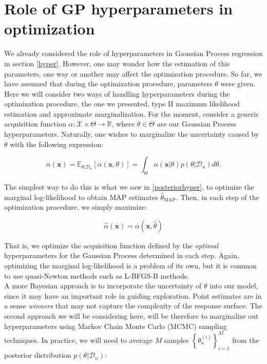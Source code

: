 \documentclass[10pt,a4paper,twoside]{book}
\begin{document}
\section{Role of GP hyperparameters in optimization}

We already considered the role of hyperparameters in Gaussian Process regression in section \ref{hyper}. However, one may wonder how the estimation of this parameters, one way or another may affect the optimization procedure. So far, we have assumed that during the optimization procedure, parameters $\theta$ were given. Here we will consider two ways of handling hyperparameters during the optimization procedure, the one we presented, type II maximum likelihood estimation and approximate marginalization. For the moment, consider a generic acquisition function $\alpha:\mathcal{X} \times \Theta \rightarrow \mathbb{R}$, where $\theta \in \Theta$ are our Gaussian Process hyperparameters. Naturally, one wishes to marginalize the uncertainty caused by $\theta$ with the following expression:

\begin{equation}
\alpha(\boldsymbol{x}) = \mathbb{E}_{\theta|\mathcal{D}_n}\left[ \alpha(\boldsymbol{x}, \theta) \right] = \int_{\Theta} \alpha(\boldsymbol{x}|\theta)p(\theta|\mathcal{D}_n)d\theta.
\end{equation}

The simplest way to do this is what we saw in \ref{posteriorhyper}, to optimize the marginal log-likelihood to obtain MAP estimates $\hat{\theta}_{\mathrm{MAP}}$. Then, in each step of the optimization procedure, we simply maximize:

\begin{equation}
\hat{\alpha}(\boldsymbol{x}) = \alpha(\boldsymbol{x}, \hat{\theta})
\end{equation}

That is, we optimize the acquisition function defined by the \textit{optimal} hyperparameters for the Gaussian Process determined in each step. Again, optimizing the marginal log-likelihood is a problem of its own, but it is common to use quasi-Newton methods such as L-BFGS-B methods.\\

A more Bayesian approach is to incorporate the uncertainty of $\theta$ into our model, since it may have an important role in guiding exploration. Point estimates are in a sense \textit{winners} that may not capture the complexity of the response surface. The second approach we will be considering here, will be therefore to marginalize out hyperparameters using Markov Chain Monte Carlo (MCMC) sampling techniques. In practice, we will need to average $M$ samples $\left\lbrace\theta_n^{(i)}\right\rbrace ^{M}_{i=1}$ from the posterior distribution $p(\theta|\mathcal{D}_n)$:
\end{document}
